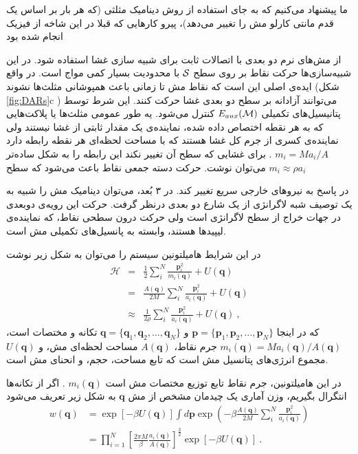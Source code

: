 ما پیشنهاد می‌کنیم که به جای استفاده از روش دینامیک مثلثی (که هر بار بر اساس یک قدم مانتی کارلو مش را تغییر می‌دهد)، پیرو کارهایی که قبلا در این شاخه از فیزیک انجام شده بود

از مش‌های نرم دو بعدی با اتصالات ثابت برای شبیه سازی غشا استفاده شود. در این شبیه‌سازی‌ها حرکت نقاط بر روی سطح 
$\cal S$
با محدودیت بسیار کمی مواج است. در واقع ایده‌ی اصلی این است که نقاط مش تا زمانی باعث همپوشانی مثلث‌ها نشوند (شکل
\ref{fig:DARs}c
) می‌توانند آزادانه بر سطح دو بعدی غشا حرکت کنند. این شرط توسط پتانیسیل‌های تکمیلی
$E_{aux}({\cal M})$
کنترل می‌شود. یه طور عمومی مثلث‌ها یا پلاکت‌هایی که به هر نقطه اختصاص داده شده، نماینده‌ی یک مقدار ثابتی از غشا نیستند ولی نماینده‌ی کسری از جرم کل غشا هستند که با مساحت لحظه‌ای هر نقطه رابطه دارد
 $m_i = M a_i/A$
. برای غشایی که سطح آن تغییر نکند این رابطه را به شکل ساده‌تر
$m_i  \approx \rho a_i$
می‌توان نوشت. حرکت دسته‌ جمعی نقاط باعث می‌شود که سطح

در پاسخ به نیروهای خارجی سریع تغییر کند. در ۳ بُعد، می‌توان دینامیک مش را شبیه به یک توصیف شبه لاگرانژی از یک شارع دو بعدی درنظر گرفت. حرکت این رویه‌ی دوبعدی در جهات خراج از سطح لاگرانژی است ولی حرکت درون سطحی نقاط، که نماینده‌ی لیپید‌ها هستند، وابسته به پانسیل‌های تکمیلی مش است.

در این شرایط هامیلتونین سیستم را می‌توان به شکل زیر نوشت
\begin{eqnarray}
\mathcal H&=& \frac12 \sum_i^N \frac{\bm p_i^2}{m_i(\bm q)} + U(\bm q) 
\label{eq:HamiltonianGeneral}\\
 &=& \frac {A(\bm q)}{2M}  \sum_i^N \frac{\bm p_i^2}{a_i(\bm q)} + U(\bm q) 
 \label{eq:HamiltonianGeneral with explicit areas}\\
&\approx& \frac {1}{2\rho}  \sum_i^N \frac{\bm p_i^2}{a_i(\bm q)} + U(\bm q) \ ,
\label{eq:HamiltonianVariableMass}
\end{eqnarray}
که در اینجا
$\bm p=\{\bm p_1,\bm p_2, \ldots, \bm p_N \}$
و
$\bm q=\{\bm q_1,\bm q_2, \ldots, \bm q_N \}$ 
تکانه و مختصات است،
$m_i(\bm q) = Ma_i(\bm q)/A(\bm q)$
جرم نقاط،
$A(\bm q)$
مساحت لحظه‌ای مش، و 
$U(\bm q)$
مجموع انرژی‌های پتانسیل مش است که تابع مساحت، حجم، و انحنای مش است.

در این هامیلتونین، جرم نقاط تابع توزیع مختصات مش است
$m_i(\bm q)$
. اگر از تکانه‌ها انتگرال بگیریم، وزن آماری یک چیدمان مشخص از مش
$\bm q$
به شکل زیر تعریف می‌شود
\begin{equation}
\begin{aligned}
w(\bm q)&=\exp\left[-\beta U(\bm q)\right]\int d\bm p\exp\left(-\beta\frac {A(\bm q)}{2M}  \sum_i^N \frac{\bm p_i^2}{a_i(\bm q)}\right)\\
&=\prod_{i=1}^N\left[\frac{2\pi M}{\beta} \frac{a_i(\bm q)}{A(\bm q)}\right]^{\frac{3}{2}}\exp\left[-\beta U(\bm q)\right]\ .
\end{aligned}
\label{eq:microStateProbability1}
\end{equation}

